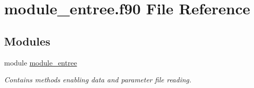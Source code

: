 \hypertarget{module__entree_8f90}{}\section{module\+\_\+entree.\+f90 File Reference}
\label{module__entree_8f90}
\subsection*{Modules}
\begin{DoxyCompactItemize}
\item 
module \hyperlink{namespacemodule__entree}{module\+\_\+entree}
\begin{DoxyCompactList}\small\item\em Contains methods enabling data and parameter file reading. \end{DoxyCompactList}\end{DoxyCompactItemize}
